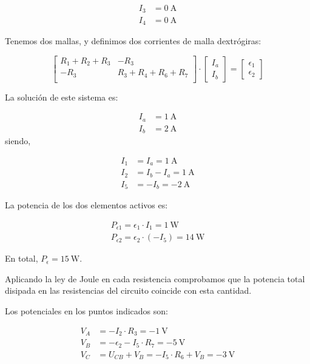\documentclass[10pt]{article}
\begin{document}
\begin{align*}
  I_3 &= \SI{0}{\ampere}\\
  I_4 &= \SI{0}{\ampere}
\end{align*}

Tenemos dos mallas, y definimos dos corrientes de malla dextrógiras:

\begin{equation*}
  \begin{bmatrix}
    R_1 + R_2 + R_3 & -R_3\\
    -R_3 & R_3 + R_4 + R_6 + R_7\\
  \end{bmatrix} \cdot %
  \begin{bmatrix}
    I_a\\
    I_b
  \end{bmatrix} = %
  \begin{bmatrix}
    \epsilon_1\\
    \epsilon_2
  \end{bmatrix}
\end{equation*}

La solución de este sistema es:

\begin{align*}
  I_a &= \SI{1}{\ampere}\\
  I_b &= \SI{2}{\ampere}
\end{align*}
siendo,

\begin{align*}
  I_1 &= I_a = \SI{1}{\ampere}\\
  I_2 &= I_b - I_a = \SI{1}{\ampere}\\
  I_5 &= -I_b = \SI{-2}{\ampere}
\end{align*}

La potencia de los dos elementos activos es:

\begin{align*}
  P_{\epsilon1} = \epsilon_1 \cdot I_1 = \SI{1}{\watt}\\
  P_{\epsilon2} = \epsilon_2 \cdot (-I_5) = \SI{14}{\watt}
\end{align*}

En total, $P_\epsilon = \SI{15}{\watt}$.

Aplicando la ley de Joule en cada resistencia comprobamos que la potencia total disipada en las resistencias del circuito coincide con esta cantidad.

Los potenciales en los puntos indicados son:

\begin{align*}
  V_A &= -I_2 \cdot R_3 = \SI{-1}{\volt}\\
  V_B &= -\epsilon_2 - I_5 \cdot R_7 = \SI{-5}{\volt}\\
  V_C &= U_{CB} + V_B = -I_5 \cdot R_6 + V_B = \SI{-3}{\volt}
\end{align*}
\end{document}
